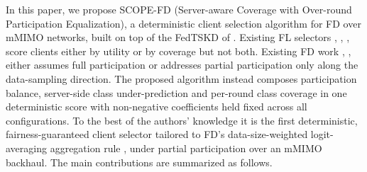 \documentclass[journal]{IEEEtran}
\newcommand{\revIVE}[1]{#1}
\begin{document}
In this paper, we propose SCOPE-FD (Server-aware Coverage with Over-round Participation Equalization), a deterministic client selection algorithm for FD over mMIMO networks, built on top of the FedTSKD of \cite{mu2024fedtskd}. Existing FL selectors \cite{nishio2019client}, \cite{cho2020bandit}, \cite{xia2020mab}, \cite{balakrishnan2022divfl} score clients either by utility or by coverage but not both. Existing FD work \cite{mu2024fedtskd}, \cite{itahara2023distillation}, \cite{liu2022active} either assumes full participation or addresses partial participation only along the data-sampling direction. The proposed algorithm instead composes participation balance, server-side class under-prediction and per-round class coverage in one deterministic score \revIVE{with non-negative coefficients held fixed across all configurations}. To the best of the authors' knowledge it is the first deterministic, fairness-guaranteed client selector tailored to FD's data-size-weighted logit-averaging aggregation rule \cite{itahara2023distillation}, \cite{mu2024fedtskd} under partial participation over an mMIMO backhaul. The main contributions are summarized as follows.
\end{document}
